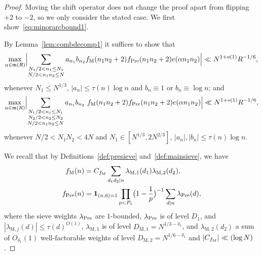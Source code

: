 \documentclass[12pt]{amsart}
\theoremstyle{definition}
\theoremstyle{remark}
\numberwithin{equation}{section}
\newcommand{\1}{\mathbf{1}}
\begin{document}
\begin{proof}
Moving the shift operator does not change the proof apart from flipping $+2$ to $-2$, so we only consider the stated case. We first show~\eqref{eq:minorarcbound1}.

By Lemma~\ref{lem:combdecomp1} it suffices to show that 
\begin{align}\label{eq:minorI}
  \max_{\alpha \in \mathfrak{m}(R)}\Bigl|\sum_{\substack{N_1/2 < n_1 \leq N_1\\ N/2 < n_1 n_2\leq N}} a_{n_1} b_{n_2}  f_{\textup{M}}(n_1n_2+2) f_{\textup{Pre}}(n_1n_2+2) e(\alpha n_1n_2)\Bigr|\ll N^{1+o(1)} R^{-1/6},
\end{align}
 whenever $N_1\leq N^{1/3}$, $|a_n|\leq \tau(n)\log n$ and $b_n\equiv 1$ or $b_n\equiv \log n$; and
 \begin{align}\label{eq:minorII}
     \max_{\alpha \in \mathfrak{m}(R)}\Bigl|\sum_{\substack{N_1/2 < n_1 \leq N_1\\ N_2/2 <  n_2 \leq N_2\\ N/2 < n_1n_2 \le N}} a_{n_1} b_{n_2}  \ f_{\textup{M}}(n_1n_2+2) f_{\textup{Pre}}(n_1n_2+2) e(\alpha n_1n_2)\Bigr|\ll N^{1+o(1)} R^{-1/6},
\end{align}
whenever $N/2<N_1 N_2<4N$ and $N_1\in [N^{1/3},2N^{2/3}]$, $|a_n|,|b_n|\leq \tau(n)\log n$.

We recall that by Definitions~\ref{def:presieve} and~\ref{def:mainsieve}, we have
\begin{align*}
      f_{\textup{M}}(n)&=C_{f_\textup{M}}\sum_{d_1d_2\mid n}\lambda_{\mathrm{M},1}(d_1)\lambda_{\mathrm{M},2}(d_2),\\
     f_{\textup{Pre}}(n)&=\1_{(n,6)=1}\prod_{p < P_1}\bigl(1-\frac{1}{p}\bigr)^{-1}\sum_{d\mid n}\lambda_{\textup{Pre}}(d),
\end{align*}
where the sieve weights $\lambda_{\textup{Pre}}$ are $1$-bounded, $\lambda_{\textup{Pre}}$ is of level $D_1$, and $|\lambda_{\mathrm{M},j}(d)|\leq \tau(d)^{O(1)}$,  $\lambda_{\mathrm{M},1}$ is of level $D_{\mathrm{M},1}=N^{1/3-\delta_1}$, and $\lambda_{\mathrm{M},2}(d_2)$ a sum of $O_{\delta_1}(1)$ well-factorable weights of level $D_{\mathrm{M},2}=N^{1/6-\delta_1}$ and $|C_{f_\textup{M}}|\ll (\log N)$.


\end{proof}
\end{document}
